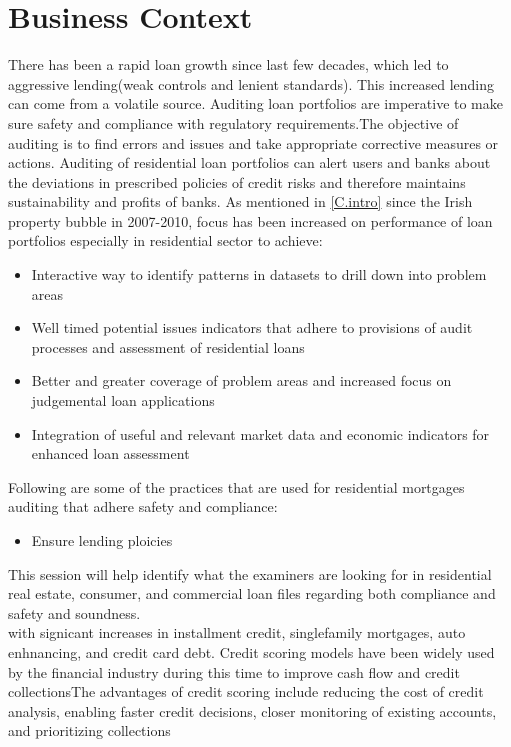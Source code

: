 \section{Business Context}
There has been a rapid loan growth since last few decades, which led to aggressive lending(weak controls and lenient standards). This increased lending can come from a volatile source. Auditing loan portfolios are imperative to make sure safety and compliance with regulatory requirements.The objective of auditing is to find errors and issues and take appropriate corrective measures or actions. Auditing of residential loan portfolios can alert users and banks about the deviations in prescribed policies of credit risks and therefore maintains sustainability and profits of banks. As mentioned in \ref{C.intro} since the Irish property bubble in 2007-2010, focus has been increased on performance of loan portfolios especially in residential sector to achieve:
\begin{itemize}
\item Interactive way to identify patterns in datasets to drill down into problem areas
\item Well timed potential issues indicators that adhere to provisions of audit processes and assessment of residential loans
\item Better and greater coverage of problem areas and increased focus on judgemental loan applications
\item Integration of useful and relevant market data and economic indicators for enhanced loan assessment
\end{itemize}



Following are some of the practices that are used for residential mortgages auditing that adhere safety and compliance:
\begin{itemize}
\item Ensure lending ploicies   
\end{itemize}

This session will help identify what the examiners are looking for in residential real estate, consumer, and commercial loan files regarding both compliance and safety and soundness.\\



with signicant increases in installment credit, singlefamily mortgages, auto enhnancing, and credit card debt. Credit scoring models have been widely used by the financial industry during this time to improve cash flow and credit collectionsThe advantages of credit scoring include reducing the cost of credit analysis, enabling faster credit decisions, closer monitoring of existing accounts, and prioritizing collections
 